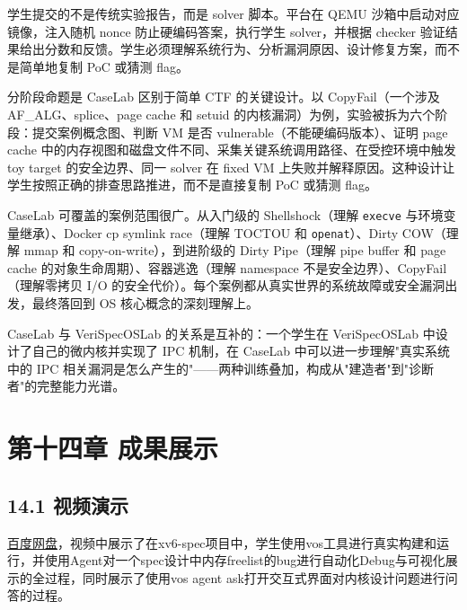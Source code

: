 \documentclass[UTF8,a4paper,12pt,openany]{ctexrep}
\newcommand{\passthrough}[1]{#1}
\begin{document}
学生提交的不是传统实验报告，而是 solver 脚本。平台在 QEMU 沙箱中启动对应镜像，注入随机 nonce 防止硬编码答案，执行学生 solver，并根据 checker 验证结果给出分数和反馈。学生必须理解系统行为、分析漏洞原因、设计修复方案，而不是简单地复制 PoC 或猜测 flag。

分阶段命题是 CaseLab 区别于简单 CTF 的关键设计。以 CopyFail（一个涉及 AF\_ALG、splice、page cache 和 setuid 的内核漏洞）为例，实验被拆为六个阶段：提交案例概念图、判断 VM 是否 vulnerable（不能硬编码版本）、证明 page cache 中的内存视图和磁盘文件不同、采集关键系统调用路径、在受控环境中触发 toy target 的安全边界、同一 solver 在 fixed VM 上失败并解释原因。这种设计让学生按照正确的排查思路推进，而不是直接复制 PoC 或猜测 flag。

CaseLab 可覆盖的案例范围很广。从入门级的 Shellshock（理解 \passthrough{\lstinline!execve!} 与环境变量继承）、Docker cp symlink race（理解 TOCTOU 和 \passthrough{\lstinline!openat!}）、Dirty COW（理解 mmap 和 copy-on-write），到进阶级的 Dirty Pipe（理解 pipe buffer 和 page cache 的对象生命周期）、容器逃逸（理解 namespace 不是安全边界）、CopyFail（理解零拷贝 I/O 的安全代价）。每个案例都从真实世界的系统故障或安全漏洞出发，最终落回到 OS 核心概念的深刻理解上。

CaseLab 与 VeriSpecOSLab 的关系是互补的：一个学生在 VeriSpecOSLab 中设计了自己的微内核并实现了 IPC 机制，在 CaseLab 中可以进一步理解"真实系统中的 IPC 相关漏洞是怎么产生的"------两种训练叠加，构成从"建造者"到"诊断者"的完整能力光谱。

\chapter{第十四章 成果展示}\label{ux7b2cux5341ux56dbux7ae0-ux6210ux679cux5c55ux793a}

\section{14.1 视频演示}\label{141-ux89c6ux9891ux6f14ux793a}

\href{https://pan.baidu.com/s/1zjlxaTdZ9d206BvfnXSDOw?pwd=88tm}{百度网盘}，视频中展示了在xv6-spec项目中，学生使用vos工具进行真实构建和运行，并使用Agent对一个spec设计中内存freelist的bug进行自动化Debug与可视化展示的全过程，同时展示了使用vos agent ask打开交互式界面对内核设计问题进行问答的过程。
\end{document}
